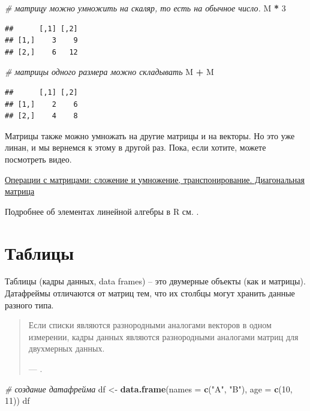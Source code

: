 \documentclass[
]{book}
\newenvironment{Shaded}{\begin{snugshade}}{\end{snugshade}}
\newcommand{\AttributeTok}[1]{\textcolor[rgb]{0.13,0.29,0.53}{#1}}
\newcommand{\CommentTok}[1]{\textcolor[rgb]{0.56,0.35,0.01}{\textit{#1}}}
\newcommand{\DecValTok}[1]{\textcolor[rgb]{0.00,0.00,0.81}{#1}}
\newcommand{\FunctionTok}[1]{\textcolor[rgb]{0.13,0.29,0.53}{\textbf{#1}}}
\newcommand{\NormalTok}[1]{#1}
\newcommand{\OtherTok}[1]{\textcolor[rgb]{0.56,0.35,0.01}{#1}}
\newcommand{\SpecialCharTok}[1]{\textcolor[rgb]{0.81,0.36,0.00}{\textbf{#1}}}
\newcommand{\StringTok}[1]{\textcolor[rgb]{0.31,0.60,0.02}{#1}}
\theoremstyle{definition}
\theoremstyle{definition}
\theoremstyle{definition}
\theoremstyle{definition}
\theoremstyle{remark}
\begin{document}
\begin{Shaded}
\begin{Highlighting}[]
\CommentTok{\# матрицу можно умножить на скаляр, то есть на обычное число. }
\NormalTok{M }\SpecialCharTok{*} \DecValTok{3}
\end{Highlighting}
\end{Shaded}

\begin{verbatim}
##      [,1] [,2]
## [1,]    3    9
## [2,]    6   12
\end{verbatim}

\begin{Shaded}
\begin{Highlighting}[]
\CommentTok{\# матрицы одного размера можно складывать}
\NormalTok{M }\SpecialCharTok{+}\NormalTok{ M}
\end{Highlighting}
\end{Shaded}

\begin{verbatim}
##      [,1] [,2]
## [1,]    2    6
## [2,]    4    8
\end{verbatim}

Матрицы также можно умножать на другие матрицы и на векторы. Но это уже линан, и мы вернемся к этому в другой раз. Пока, если хотите, можете посмотреть видео.

\href{https://vk.com/video-211800158_456239317}{Операции с матрицами: сложение и умножение, транспонирование. Диагональная матрица}

Подробнее об элементах линейной алгебры в R см. \citep{буховец2015}.

\hypertarget{ux442ux430ux431ux43bux438ux446ux44b}{%
\section{Таблицы}\label{ux442ux430ux431ux43bux438ux446ux44b}}

Таблицы (кадры данных, data frames) -- это двумерные объекты (как и матрицы). Датафреймы отличаются от матриц тем, что их столбцы могут хранить данные разного типа.

\begin{quote}
Если списки являются разнородными аналогами векторов в одном измерении, кадры данных являются разнородными аналогами матриц для двухмерных данных.

--- \citep[133]{мэтлофф2019}.
\end{quote}

\begin{Shaded}
\begin{Highlighting}[]
\CommentTok{\# создание датафрейма}
\NormalTok{df }\OtherTok{\textless{}{-}} \FunctionTok{data.frame}\NormalTok{(}\AttributeTok{names =} \FunctionTok{c}\NormalTok{(}\StringTok{"A"}\NormalTok{, }\StringTok{"B"}\NormalTok{), }\AttributeTok{age =} \FunctionTok{c}\NormalTok{(}\DecValTok{10}\NormalTok{, }\DecValTok{11}\NormalTok{))}
\NormalTok{df}
\end{Highlighting}
\end{Shaded}
\end{document}
